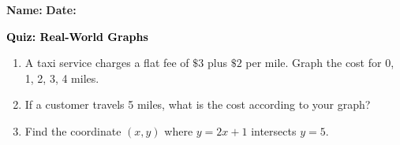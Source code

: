 \documentclass[12pt, letterpaper, fleqn]{article}
\begin{document}
\textbf{Name:} \underline{\hspace{5cm}}
\hfill
\textbf{Date:} \underline{\hspace{3cm}}\\

\begin{tcolorbox}[colback=customteal!20]
    \large\textcolor{black}{\textbf{Quiz: Real-World Graphs}}
\end{tcolorbox}
\begin{enumerate}[itemsep=3.5cm, leftmargin=0.6cm]
\item A taxi service charges a flat fee of $\$3$ plus $\$2$ per mile. Graph the cost for 0, 1, 2, 3, 4 miles.
\vspace{4cm}
\item If a customer travels 5 miles, what is the cost according to your graph?
\vspace{3cm}
\item Find the coordinate $(x,y)$ where $y = 2x + 1$ intersects $y = 5$.
\end{enumerate}
\end{document}
